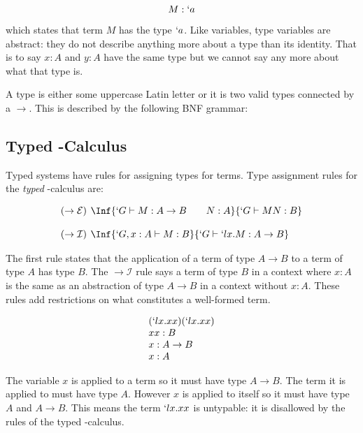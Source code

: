   \[
    M : `a 
  \]
  
  which states that term $M$ has the type $`a$. Like variables, type 
  variables are abstract: they do not describe anything more about a 
  type than its identity. That is to say $x: A$ and $y : A$ have the
  same type but we cannot say any more about what that type is.
 
  A type is either some uppercase Latin letter or it is two valid types
  connected by a $\rightarrow$. This is described by the following
  BNF grammar:
  
  
  \subsection{Typed \lam-Calculus}
  Typed systems have rules for assigning types for terms.
  Type assignment rules for the \emph{typed} \lam-calculus are:

  \[
    \begin{array}{lcrc}
    { (\to\mathcal{E}}) \hspace{4pt} \Inf{
      `G \vdash M : A \to B \hspace{20pt} N:A 
    }{
      `G \vdash M N : B 
    }
    \\
    \\
    { (\to\mathcal{I}}) \hspace{4pt} \Inf{
      `G,x:A \vdash M : B
    }{
      `G \vdash `lx.M : A \to B 
    }
    \end{array}
  \]

  The first rule states that the application of a term of type $A \to B$ to
  a term of type $A$ has type $B$.
  The $\to\mathcal{I}$ rule says a term of type $B$ in a context where $x:A$
  is the same as an abstraction of type $A \to B$ in a context without $x:A$. 
  These rules add restrictions on what constitutes a well-formed term.
  
  \begin{example}
  \[  
  \begin{array}{lr}
    (`lx.xx)(`lx.xx) \\
    xx : B \\
    x : A \to B \\
    x : A
  \end{array}
  \]
  
  The variable $x$ is applied to a term so it must have type $A \to B$.
  The term it is applied to must have type $A$.
  However $x$ is applied to itself so it must have type $A$ and $A \to B$.
  This means the term $`lx.xx$ is untypable:
  it is disallowed by the rules of the typed \lam-calculus.
  \end{example}
 
